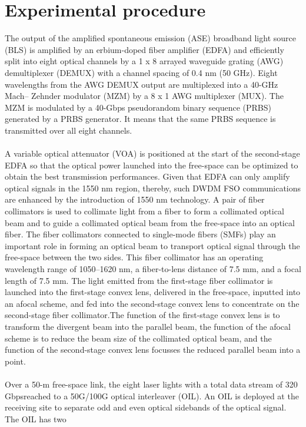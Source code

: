 \documentclass[hidelinks, 12pt]{report}
\begin{document}
\section{Experimental procedure}
The output of the amplified
spontaneous emission (ASE) broadband light source (BLS) is amplified by an erbium-doped
fiber amplifier (EDFA) and efficiently split into eight optical channels by a 1 x 8 arrayed waveguide
grating (AWG) demultiplexer (DEMUX) with a channel spacing of 0.4 nm (50 GHz). Eight
wavelengths from the AWG DEMUX output are multiplexed into a 40-GHz Mach–
Zehnder modulator (MZM) by a 8 x 1 AWG multiplexer (MUX). The MZM is modulated by a
40-Gbps pseudorandom binary sequence (PRBS) generated by a PRBS generator. It
means that the same PRBS sequence is transmitted over all eight channels. \\
\\A variable optical
attenuator (VOA) is positioned at the start of the second-stage EDFA so that the optical power
launched into the free-space can be optimized to obtain the best transmission performances.
Given that EDFA can only amplify optical signals in the 1550 nm region, thereby, such DWDM
FSO communications are enhanced by the introduction of 1550 nm technology. A pair of fiber
collimators is used to collimate light from a fiber to form a collimated optical beam and to guide a
collimated optical beam from the free-space into an optical fiber. The fiber collimators connected
to single-mode fibers (SMFs) play an important role in forming an optical beam to transport optical
signal through the free-space between the two sides. This fiber collimator has an operating
wavelength range of 1050–1620 nm, a fiber-to-lens distance of 7.5 mm, and a focal length of
7.5 mm. The light emitted from the first-stage fiber collimator is launched into the first-stage
convex lens, delivered in the free-space, inputted into an afocal scheme, and fed into the
second-stage convex lens to concentrate on the second-stage fiber collimator.The function of
the first-stage convex lens is to transform the divergent beam into the parallel beam, the function
of the afocal scheme is to reduce the beam size of the collimated optical beam, and the function
of the second-stage convex lens focusses the reduced parallel beam into a point.\\
\\Over a 50-m free-space link, the eight laser lights with a total data stream of 320 Gbpsreached to a 50G/100G optical interleaver (OIL). An OIL is deployed at the
receiving site to separate odd and even optical sidebands of the optical signal. The OIL has two
\end{document}
